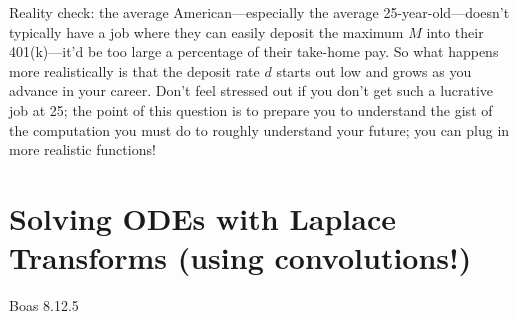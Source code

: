 \documentclass[answers]{exam}\newcommand{\repositoryInformationSetup}{     \usepackage[dvipsnames]{xcolor}     \usepackage[ angle=90, color=black, opacity=1, scale=2, ]{background}      \SetBgPosition{current page.west}      \SetBgVshift{-4.5mm}      \backgroundsetup{contents={{\color{green}\texttt{-{}-} differs from commit \texttt{40a9b87} in 0 files}}} } \newcommand{\commit}{{{\color{green}40a9b87}}}\usepackage{amsmath}
\begin{document}
\begin{questions}
	Reality check: the average American---especially the average 25-year-old---doesn't typically have a job where they can easily deposit the maximum $M$ into their 401(k)---it'd be too large a percentage of their take-home pay.
	So what happens more realistically is that the deposit rate $d$ starts out low and grows as you advance in your career.
	Don't feel stressed out if you don't get such a lucrative job at 25; the point of this question is to prepare you to understand the gist of the computation you must do to roughly understand your future; you can plug in more realistic functions!



	\section*{Solving ODEs with Laplace Transforms (using convolutions!)}
	\question Boas 8.12.5


\end{questions}
\end{document}
